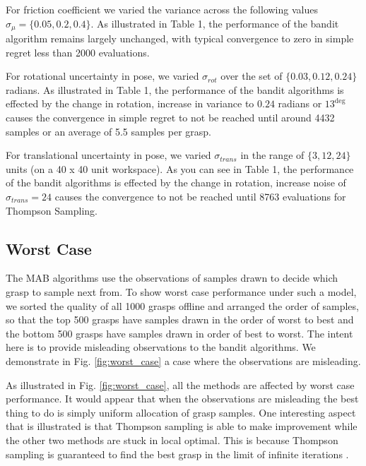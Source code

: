 \documentclass[a4paper, 10pt, conference]{ieeeconf}      %
\begin{document}
For friction coefficient we varied the variance across the following values $\sigma_{\mu} = \lbrace 0.05, 0.2, 0.4 \rbrace$. As illustrated in Table 1, the performance of the bandit algorithm remains largely unchanged, with typical convergence to zero in simple regret less than 2000 evaluations.

For rotational uncertainty in pose, we varied $\sigma_{rot}$ over the set of $\lbrace 0.03, 0.12,0.24\rbrace$ radians. As illustrated in Table 1, the performance of the bandit algorithms is effected by the change in rotation, increase in variance to $0.24$ radians or $13^{\deg}$  causes the convergence in simple regret to not be reached until around 4432 samples or an average of 5.5 samples per grasp. 

For translational uncertainty in pose, we varied $\sigma_{trans}$ in the range of $\lbrace 3,12, 24 \rbrace$ units (on a 40 x 40 unit workspace). As you can see in Table 1, the performance of the bandit algorithms is effected by the change in rotation, increase noise of $\sigma_{trans} = 24$ causes the convergence to not be reached until 8763 evaluations for Thompson Sampling. 



\subsection{Worst Case}
The MAB algorithms use the observations of samples drawn to decide which grasp to sample next from. To show worst case performance under such a model, we sorted the quality of all 1000 grasps offline and arranged the order of samples, so that the top 500 grasps have samples drawn in the order of worst to best and the bottom 500 grasps have samples drawn in order of best to worst. The intent here is to provide misleading observations to the bandit algorithms. We demonstrate in Fig. \ref{fig:worst_case} a case where the observations are misleading. 

As illustrated in Fig. \ref{fig:worst_case}, all the methods are affected by worst case performance. It would appear that when the observations are misleading the best thing to do is simply uniform allocation of grasp samples. One interesting aspect that is illustrated is that Thompson sampling is able to make improvement while the other two methods are stuck in local optimal. This is because Thompson sampling is guaranteed to find the best grasp in the limit of infinite iterations \cite{agrawal2011analysis}.
\end{document}
